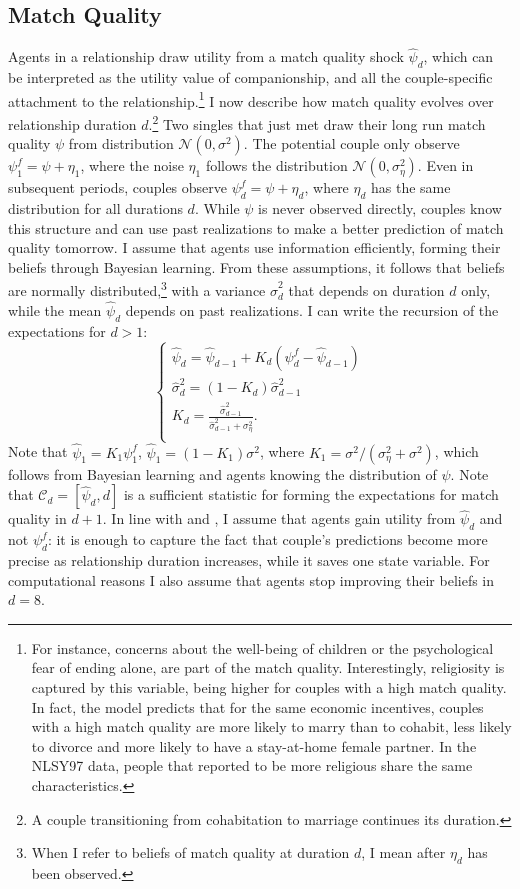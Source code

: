 \documentclass[12pt]{article}
\begin{document}
\subsection{Match Quality}
Agents in a relationship draw utility from a match quality shock $\hat{\psi}_d$, which can be interpreted as the utility value of companionship, and all the couple-specific attachment to the relationship.\footnote{For instance, concerns about the well-being of children or the psychological fear of ending alone, are part of the match quality. Interestingly, religiosity is captured by this variable, being higher for couples with a high match quality. In fact, the model predicts that for the same economic incentives, couples with a high match quality are more likely to marry than to cohabit, less likely to divorce and more likely to have a stay-at-home female partner. In the NLSY97 data, people that reported to be more religious share the same characteristics.} I now describe how match quality evolves over relationship duration $d$.\footnote{A couple transitioning from cohabitation to marriage continues its duration.} Two singles that just met draw their long run match quality $\psi$ from distribution $\mathcal{N}(0,\sigma^2)$. The potential couple only observe $\psi^f_1=\psi+\eta_1$, where the noise $\eta_1$ follows the distribution $\mathcal{N}(0,\sigma_\eta^2)$. Even in subsequent periods, couples observe $\psi^f_d=\psi+\eta_d$, where $\eta_d$ has the same distribution for all durations $d$. While $\psi$ is never observed directly, couples know this structure and can use past realizations to make a better prediction of match quality tomorrow. I assume that agents use information efficiently, forming their beliefs through Bayesian learning. From these assumptions, it follows that beliefs are normally distributed,\footnote{When I refer to beliefs of match quality at duration $d$, I mean after $\eta_d$ has been observed.} with a variance $\hat{\sigma}_d^2$ that depends on duration $d$ only, while the mean $\hat{\psi}_d$ depends on past realizations. I can write the recursion of the expectations for $d>1$:
\begin{equation}\label{eq:kalman}
\begin{cases}
\hat{\psi}_{d}=\hat{\psi}_{d-1}+ K_{d}(\psi^f_{d}-\hat{\psi}_{d-1})\\
\hat{\sigma}_{d}^2=(1-K_{d})\hat{\sigma}_{d-1}^2\\
K_{d}=\frac{\hat{\sigma}_{d-1}^2}{\hat{\sigma}_{d-1}^2+\sigma_{\eta}^2}.\\
\end{cases}
\end{equation}
Note that $\hat{\psi}_1=K_1\psi^f_1$, $\hat{\psi}_1=(1-K_1)\sigma^2$, where $K_1=\sigma^2/(\sigma_\eta^2+\sigma^2)$, which follows from Bayesian learning and agents knowing the distribution of $\psi$. Note that $\mathcal{C}_d=[\hat{\psi}_d,d]$ is a sufficient statistic for forming the expectations for match quality in $d+1$. In line with \cite{brien2006} and \cite{marinescu2016}, I assume that agents gain utility from $\hat{\psi}_d$ and not ${\psi}^f_d$: it is enough to capture the fact that couple's predictions become more precise as relationship duration increases, while it saves one state variable. For computational reasons I also assume that agents stop improving their beliefs in $d=8$.
\end{document}
